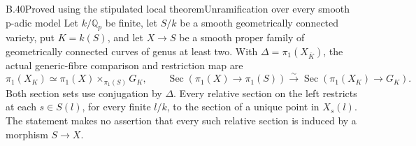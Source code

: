 \begin{statement}{B.40}{Proved using the stipulated local theorem}{Unramification over every smooth p-adic model}
Let $k/\mathbb Q_p$ be finite, let $S/k$ be a smooth
geometrically connected variety, put $K=k(S)$, and
let $X\to S$ be a smooth proper family of
geometrically connected curves of genus at least two.
With $\Delta=\pi_1(X_{\overline K})$, the actual
generic-fibre comparison and restriction map are
\[
 \pi_1(X_K)\simeq
       \pi_1(X)\times_{\pi_1(S)}G_K,
 \qquad
 \operatorname{Sec}(\pi_1(X)\to\pi_1(S))
       \xrightarrow{\sim}
 \operatorname{Sec}(\pi_1(X_K)\to G_K).
 \tag{B.40.1}
\]
Both section sets use conjugation by $\Delta$.
Every relative section on the left restricts at
each $s\in S(l)$, for every finite $l/k$, to the
section of a unique point in $X_s(l)$.
The statement makes no assertion that every such
relative section is induced by a morphism $S\to X$.
\end{statement}
